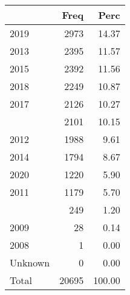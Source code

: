 
\begin{tabular}[t]{lrr}
\toprule
  & Freq & Perc\\
\midrule
2019 & 2973 & 14.37\\
2013 & 2395 & 11.57\\
2015 & 2392 & 11.56\\
2018 & 2249 & 10.87\\
2017 & 2126 & 10.27\\
\addlinespace
2016 & 2101 & 10.15\\
2012 & 1988 & 9.61\\
2014 & 1794 & 8.67\\
2020 & 1220 & 5.90\\
2011 & 1179 & 5.70\\
\addlinespace
2010 & 249 & 1.20\\
2009 & 28 & 0.14\\
2008 & 1 & 0.00\\
Unknown & 0 & 0.00\\
Total & 20695 & 100.00\\
\bottomrule
\end{tabular}
